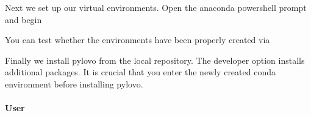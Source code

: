 \documentclass[letterpaper,10pt,english]{sphinxmanual}
\begin{document}
\begin{sphinxVerbatim}[commandchars=\\\{\}]
    
\end{sphinxVerbatim}

\sphinxAtStartPar
Next we set up our virtual environments. Open the anaconda powershell prompt and begin

\begin{sphinxVerbatim}[commandchars=\\\{\}]
 
    
    
\end{sphinxVerbatim}

\sphinxAtStartPar
You can test whether the environments have been properly created via

\begin{sphinxVerbatim}[commandchars=\\\{\}]
  
  
 
\end{sphinxVerbatim}

\sphinxAtStartPar
Finally we install pylovo from the local repository. The developer option installs additional packages.
It is crucial that you enter the newly created conda environment before installing pylovo.


\paragraph{User}
\label{\detokenize{docs_pylovo/installation:user}}
\begin{sphinxVerbatim}[commandchars=\\\{\}]
  
 
   
\end{sphinxVerbatim}
\end{document}
